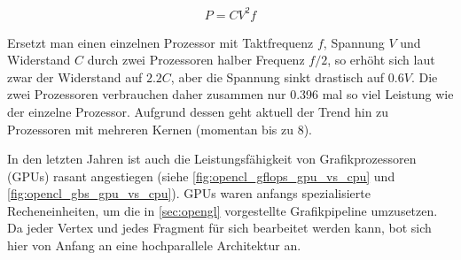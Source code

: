 \begin{align}
P = C V^2 f
\end{align}

Ersetzt man einen einzelnen Prozessor mit Taktfrequenz $f$, Spannung
$V$ und Widerstand $C$ durch zwei Prozessoren halber Frequenz $f/2$,
so erhöht sich laut \cite{Chandrakasan1995} zwar der Widerstand auf
$2.2C$, aber die Spannung sinkt drastisch auf $0.6V$. Die zwei
Prozessoren verbrauchen daher zusammen nur 0.396 mal so viel Leistung
wie der einzelne Prozessor. Aufgrund dessen geht aktuell der Trend hin
zu Prozessoren mit mehreren Kernen (momentan bis zu 8).

In den letzten Jahren ist auch die Leistungsfähigkeit von
Grafikprozessoren (GPUs) rasant angestiegen (siehe
\autoref{fig:opencl_gflops_gpu_vs_cpu} und
\autoref{fig:opencl_gbs_gpu_vs_cpu}). GPUs waren anfangs spezialisierte Recheneinheiten, um die in
\autoref{sec:opengl} vorgestellte Grafikpipeline umzusetzen. Da jeder
Vertex und jedes Fragment für sich bearbeitet werden kann, bot sich
hier von Anfang an eine hochparallele Architektur an.

